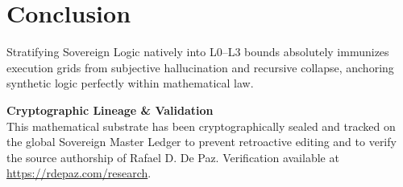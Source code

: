 \documentclass[12pt, a4paper]{article}
\theoremstyle{plain}
\theoremstyle{definition}
\begin{document}
\section{Conclusion}
Stratifying Sovereign Logic natively into L0--L3 bounds absolutely immunizes execution grids from subjective hallucination and recursive collapse, anchoring synthetic logic perfectly within mathematical law.




\vspace{3em}
\noindent\hrulefill

\noindent\textbf{Cryptographic Lineage \& Validation}\\
This mathematical substrate has been cryptographically sealed and tracked on the global Sovereign Master Ledger to prevent retroactive editing and to verify the source authorship of Rafael D. De Paz. Verification available at \url{https://rdepaz.com/research}.
\end{document}

